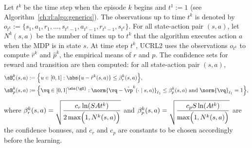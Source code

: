 Let $t^k$ be the time step when the episode $k$ begins and $t^1:=1$ (see Algorithm~\ref{ch:rl:algo:generics}).
The observations up to time $t^k$ is denoted by $o_{t^k}{:=}\{s_1,a_1,r_1,\dots,s_{t^k-1},a_{t^k-1},r_{t^k-1},s_{t^k}\}$.
For all state-action pair $(s,a)$, let $N^k(s,a)$ be the number of times up to $t^k$ that the algorithm executes action $a$ when the MDP is in state $s$.
At time step $t^k$, UCRL2 uses the observations $o_{t^k}$ to compute $\hat{r}^k$ and $\hat{p}^k$, the empirical means of $r$ and $p$.
The confidence sets for reward and transition are then computed: for all state-action pair $(s,a)$,
\begin{align*}
    \sB_r^k(s,a)&:=\Bigl\{u\in[0,1] : \abs{u-\hat{r}^k(s,a)}\le\beta^k_r(s,a)\Bigr\}, \\
    \sB_p^k(s,a)&:=\Bigl\{\vq\in[0,1]^{\abs{\gS}}: \norm{\vq-\hat{\vp}^k(\cdot\mid s,a)}_{\ell_1}\le \beta^k_p(s,a)
    \text{ and }\norm{\vq}_{\ell_1}=1\Bigr\},
\end{align*}
where $\beta_r^k(s,a)=\displaystyle\sqrt{\frac{c_r\ln(SAt^k)}{2\max\Bigl(1,N^k(s,a)\Bigr)}}$ and $\beta_p^k(s,a)=\displaystyle\sqrt{\frac{c_pS\ln(At^k)}{\max\Bigl(1,N^k(s,a)\Bigr)}}$ are the confidence bonuses, and $c_r$ and $c_p$ are constants to be chosen accordingly before the learning.

